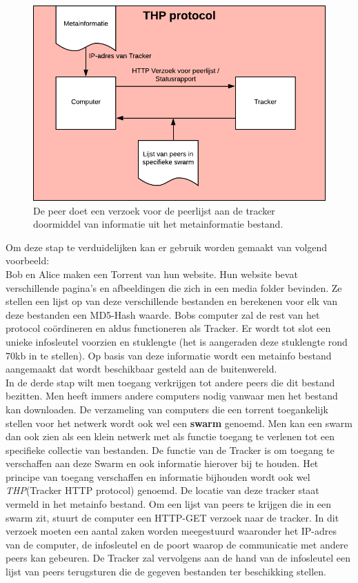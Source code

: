 \begin{figure}[h!]
	\centering
		\includegraphics[scale=.4]{torrent-2.png}
			\caption[THP stap - Torrenting 2]{De peer doet een verzoek voor de peerlijst aan de tracker doormiddel van informatie uit het metainformatie bestand.}
\end{figure}
\newpage
Om deze stap te verduidelijken kan er gebruik worden gemaakt van volgend voorbeeld:\\

Bob en Alice maken een Torrent van hun website. Hun website bevat verschillende pagina's en afbeeldingen die zich in een media folder bevinden. Ze stellen een lijst op van deze verschillende bestanden en berekenen voor elk van deze bestanden een MD5-Hash waarde. Bobs computer zal de rest van het protocol coördineren en aldus functioneren als Tracker. Er wordt tot slot een unieke infosleutel voorzien en stuklengte (het is aangeraden deze stuklengte rond 70kb in te stellen). Op basis van deze informatie wordt een metainfo bestand aangemaakt dat wordt beschikbaar gesteld aan de buitenwereld.\\

In de derde stap wilt men toegang verkrijgen tot andere peers die dit bestand bezitten. Men heeft immers andere computers nodig vanwaar men het bestand kan downloaden. De verzameling van computers die een torrent toegankelijk stellen voor het netwerk wordt ook wel een \textbf{swarm} genoemd. Men kan een swarm dan ook zien als een klein netwerk met als functie toegang te verlenen tot een specifieke collectie van bestanden. De functie van de Tracker is om toegang te verschaffen aan deze Swarm en ook informatie hierover bij te houden. Het principe van toegang verschaffen en informatie bijhouden wordt ook wel \textit{THP}(Tracker HTTP protocol) genoemd. De locatie van deze tracker staat vermeld in het metainfo bestand. Om een lijst van peers te krijgen die in een swarm zit, stuurt de computer een HTTP-GET verzoek naar de tracker. In dit verzoek moeten een aantal zaken worden meegestuurd waaronder het IP-adres van de computer, de infosleutel en de poort waarop de communicatie met andere peers kan gebeuren. De Tracker zal vervolgens aan de hand van de infosleutel een lijst van peers terugsturen die de gegeven bestanden ter beschikking stellen.\\

